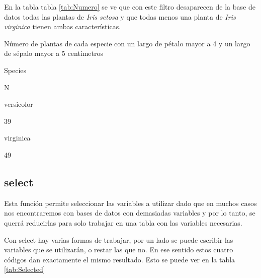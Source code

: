 \documentclass[]{book}
\newenvironment{Shaded}{\begin{snugshade}}{\end{snugshade}}
\newcommand{\KeywordTok}[1]{\textcolor[rgb]{0.13,0.29,0.53}{\textbf{#1}}}
\newcommand{\NormalTok}[1]{#1}
\newcommand{\OperatorTok}[1]{\textcolor[rgb]{0.81,0.36,0.00}{\textbf{#1}}}
\newcommand{\StringTok}[1]{\textcolor[rgb]{0.31,0.60,0.02}{#1}}
\begin{document}
En la tabla tabla \ref{tab:Numero} se ve que con este filtro desaparecen
de la base de datos todas las plantas de \emph{Iris setosa} y que todas
menos una planta de \emph{Iris virginica} tienen ambas características.

\label{tab:Numero}Número de plantas de cada especie con un largo de pétalo
mayor a 4 y un largo de sépalo mayor a 5 centímetros

Species

N

versicolor

39

virginica

49

\hypertarget{select}{%
\subsection{select}\label{select}}

Esta función permite seleccionar las variables a utilizar dado que en
muchos casos nos encontraremos con bases de datos con demasiadas
variables y por lo tanto, se querrá reducirlas para solo trabajar en una
tabla con las variables necesarias.

Con select hay varias formas de trabajar, por un lado se puede escribir
las variables que se utilizarán, o restar las que no. En ese sentido
estos cuatro códigos dan exactamente el mismo resultado. Esto se puede
ver en la tabla \ref{tab:Selected}

\begin{Shaded}
\end{Shaded}

\begin{Shaded}
\end{Shaded}
\end{document}
